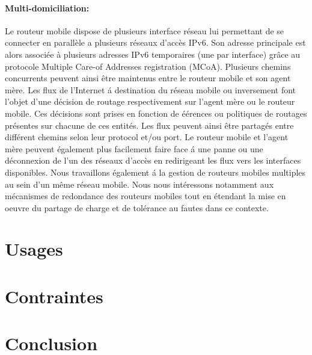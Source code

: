 \documentclass[12pt]{article}
\begin{document}
\paragraph{Multi-domiciliation:} 
Le routeur mobile dispose de plusieurs interface r\'{e}seau lui permettant de se connecter en parall\`{e}le a plusieurs r\'{e}seaux d'acc\`{e}s IPv6. Son adresse principale est alors associ\'{e}e \`{a} plusieurs adresses IPv6 temporaires (une par interface) gr\^{a}ce au protocole Multiple Care-of Addresses registration (MCoA). Plusieurs chemins concurrents peuvent ainsi \^{e}tre maintenus entre le routeur mobile et son agent m\`{e}re.
Les flux de l'Internet \'{a} destination du r\'{e}seau mobile ou inversement font l'objet d'une d\'{e}cision de routage respectivement sur l'agent m\`{e}re ou le routeur mobile. Ces d\'{e}cisions sont prises en fonction de \'{e}\'{e}rences ou politiques de routages pr\'{e}sentes sur chacune de ces entit\'{e}s.
Les flux peuvent ainsi \^{e}tre partag\'{e}s entre diff\'{e}rent chemins selon leur protocol et/ou port. Le routeur mobile et l'agent m\`{e}re peuvent \'{e}galement plus facilement faire face \'{a} une panne ou une d\'{e}connexion de l'un des r\'{e}seaux d'acc\`{e}s en redirigeant les flux vers les interfaces disponibles.
Nous travaillons \'{e}galement \'{a} la gestion de routeurs mobiles multiples au sein d'un m\^{e}me r\'{e}seau mobile. Nous nous int\'{e}ressons notamment aux m\'{e}canismes de redondance des routeurs mobiles tout en \'{e}tendant la mise en oeuvre du partage de charge et de tol\'{e}rance au fautes dans ce contexte.






\section{Usages}
\section{Contraintes}
\section{Conclusion}
\end{document}

